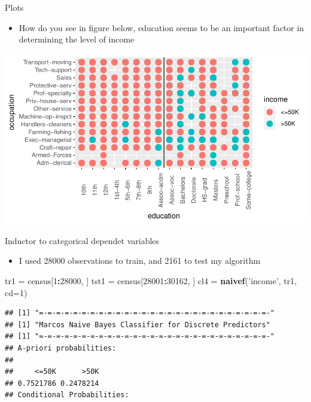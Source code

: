 \documentclass[
  10pt,
  ignorenonframetext,
]{beamer}
\newenvironment{Shaded}{\begin{snugshade}}{\end{snugshade}}
\newcommand{\DataTypeTok}[1]{\textcolor[rgb]{0.13,0.29,0.53}{#1}}
\newcommand{\DecValTok}[1]{\textcolor[rgb]{0.00,0.00,0.81}{#1}}
\newcommand{\KeywordTok}[1]{\textcolor[rgb]{0.13,0.29,0.53}{\textbf{#1}}}
\newcommand{\NormalTok}[1]{#1}
\newcommand{\OperatorTok}[1]{\textcolor[rgb]{0.81,0.36,0.00}{\textbf{#1}}}
\newcommand{\StringTok}[1]{\textcolor[rgb]{0.31,0.60,0.02}{#1}}
\providecommand{\tightlist}{%
  \setlength{\itemsep}{0pt}\setlength{\parskip}{0pt}}
\begin{document}
\begin{frame}{Plots}
\protect\hypertarget{plots-2}{}

\begin{itemize}
\tightlist
\item
  How do you see in figure below, education seems to be an important
  factor in determining the level of income
\end{itemize}

\includegraphics{MJ_Ribeiro_files/figure-beamer/unnamed-chunk-22-1.pdf}

\end{frame}

\begin{frame}[fragile]{Inductor to categorical dependet variables}
\protect\hypertarget{inductor-to-categorical-dependet-variables-2}{}

\begin{itemize}
\tightlist
\item
  I used 28000 observations to train, and 2161 to test my algorithm
\end{itemize}

\begin{Shaded}
\begin{Highlighting}[]
\NormalTok{tr1 =}\StringTok{ }\NormalTok{census[}\DecValTok{1}\OperatorTok{:}\DecValTok{28000}\NormalTok{, ]}
\NormalTok{tst1 =}\StringTok{ }\NormalTok{census[}\DecValTok{28001}\OperatorTok{:}\DecValTok{30162}\NormalTok{, ]}
\NormalTok{cl4 =}\StringTok{  }\KeywordTok{naivef}\NormalTok{(}\StringTok{'income'}\NormalTok{, tr1, }\DataTypeTok{cd=}\DecValTok{1}\NormalTok{)}
\end{Highlighting}
\end{Shaded}

\begin{verbatim}
## [1] "=-=-=-=-=-=-=-=-=-=-=-=-=-=-=-=-=-=-=-=-=-=-=-=-=-=-=-"
## [1] "Marcos Naive Bayes Classifier for Discrete Predictors"
## [1] "=-=-=-=-=-=-=-=-=-=-=-=-=-=-=-=-=-=-=-=-=-=-=-=-=-=-=-"
## A-priori probabilities:
## 
##     <=50K      >50K 
## 0.7521786 0.2478214 
## Conditional Probabilities:
\end{verbatim}

\end{frame}
\end{document}
